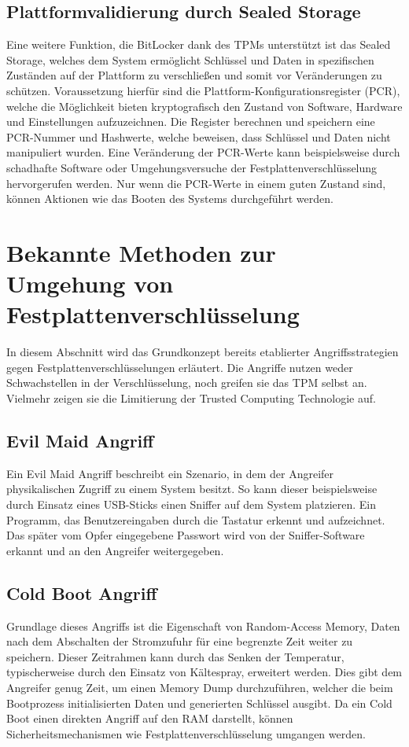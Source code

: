 \documentclass[conference]{IEEEtran}
\begin{document}
\subsection{Plattformvalidierung durch Sealed Storage}
Eine weitere Funktion, die BitLocker dank des TPMs unterstützt ist das Sealed Storage, welches dem System ermöglicht Schlüssel und Daten in spezifischen Zuständen auf der Plattform zu verschließen und somit vor Veränderungen zu schützen. Voraussetzung hierfür sind die Plattform-Konfigurationsregister (PCR), welche die Möglichkeit bieten kryptografisch den Zustand von Software, Hardware und Einstellungen aufzuzeichnen. Die Register berechnen und speichern eine PCR-Nummer und Hashwerte, welche beweisen, dass Schlüssel und Daten nicht manipuliert wurden. Eine Veränderung der PCR-Werte kann beispielsweise durch schadhafte Software oder Umgehungsversuche der Festplattenverschlüsselung hervorgerufen werden. Nur wenn die PCR-Werte in einem guten Zustand sind, können Aktionen wie das Booten des Systems durchgeführt werden. \cite{Osborn.2013}

\section{Bekannte Methoden zur Umgehung von Festplattenverschlüsselung}
In diesem Abschnitt wird das Grundkonzept bereits etablierter Angriffsstrategien gegen Festplattenverschlüsselungen erläutert. Die Angriffe nutzen weder Schwachstellen in der Verschlüsselung, noch greifen sie das TPM selbst an. Vielmehr zeigen sie die Limitierung der Trusted Computing Technologie auf.

\subsection{Evil Maid Angriff}
Ein Evil Maid Angriff beschreibt ein Szenario, in dem der Angreifer physikalischen Zugriff zu einem System besitzt. So kann dieser beispielsweise durch Einsatz eines USB-Sticks einen Sniffer auf dem System platzieren. Ein Programm, das Benutzereingaben durch die Tastatur erkennt und aufzeichnet. Das später vom Opfer eingegebene Passwort wird von der Sniffer-Software erkannt und an den Angreifer weitergegeben.

\subsection{Cold Boot Angriff}
Grundlage dieses Angriffs ist die Eigenschaft von Random-Access Memory, Daten nach dem Abschalten der Stromzufuhr für eine begrenzte Zeit weiter zu speichern. Dieser Zeitrahmen kann durch das Senken der Temperatur, typischerweise durch den Einsatz von Kältespray, erweitert werden. Dies gibt dem Angreifer genug Zeit, um einen Memory Dump durchzuführen, welcher die beim Bootprozess initialisierten Daten und generierten Schlüssel ausgibt. Da ein Cold Boot einen direkten Angriff auf den RAM darstellt, können Sicherheitsmechanismen wie Festplattenverschlüsselung umgangen werden.
\end{document}
